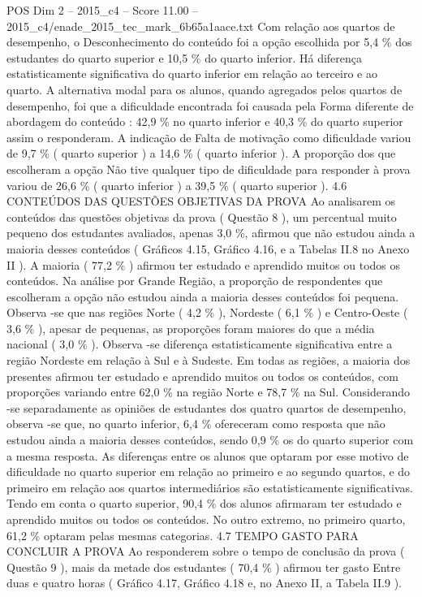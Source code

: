 \begin{textsample}{POS Dim 2 – 2015\_c4 – Score 11.00 – 2015\_c4/enade\_2015\_tec\_mark\_6b65a1aace.txt}
Com relação aos quartos de desempenho, o Desconhecimento do conteúdo foi a opção escolhida por 5,4 \% dos estudantes do quarto superior e 10,5 \% do quarto inferior.
Há diferença estatisticamente significativa do quarto inferior em relação ao terceiro e ao quarto.
A alternativa modal para os alunos, quando agregados pelos quartos de desempenho, foi que a dificuldade encontrada foi causada pela Forma diferente de abordagem do conteúdo : 42,9 \% no quarto inferior e 40,3 \% do quarto superior assim o responderam.
A indicação de Falta de motivação como dificuldade variou de 9,7 \% ( quarto superior ) a 14,6 \% ( quarto inferior ).
A proporção dos que escolheram a opção Não tive qualquer tipo de dificuldade para responder à prova variou de 26,6 \% ( quarto inferior ) a 39,5 \% ( quarto superior ). 4.6 CONTEÚDOS DAS QUESTÕES OBJETIVAS DA PROVA Ao analisarem os conteúdos das questões objetivas da prova ( Questão 8 ), um percentual muito pequeno dos estudantes avaliados, apenas 3,0 \%, afirmou que não estudou ainda a maioria desses conteúdos ( Gráficos 4.15, Gráfico 4.16, e a Tabelas II.8 no Anexo II ).
A maioria ( 77,2 \% ) afirmou ter estudado e aprendido muitos ou todos os conteúdos.
Na análise por Grande Região, a proporção de respondentes que escolheram a opção não estudou ainda a maioria desses conteúdos foi pequena.
Observa -se que nas regiões Norte ( 4,2 \% ), Nordeste ( 6,1 \% ) e Centro-Oeste ( 3,6 \% ), apesar de pequenas, as proporções foram maiores do que a média nacional ( 3,0 \% ).
Observa -se diferença estatisticamente significativa entre a região Nordeste em relação à Sul e à Sudeste.
Em todas as regiões, a maioria dos presentes afirmou ter estudado e aprendido muitos ou todos os conteúdos, com proporções variando entre 62,0 \% na região Norte e 78,7 \% na Sul.
Considerando -se separadamente as opiniões de estudantes dos quatro quartos de desempenho, observa -se que, no quarto inferior, 6,4 \% ofereceram como resposta que não estudou ainda a maioria desses conteúdos, sendo 0,9 \% os do quarto superior com a mesma resposta.
As diferenças entre os alunos que optaram por esse motivo de dificuldade no quarto superior em relação ao primeiro e ao segundo quartos, e do primeiro em relação aos quartos intermediários são estatisticamente significativas.
Tendo em conta o quarto superior, 90,4 \% dos alunos afirmaram ter estudado e aprendido muitos ou todos os conteúdos.
No outro extremo, no primeiro quarto, 61,2 \% optaram pelas mesmas categorias. 4.7 TEMPO GASTO PARA CONCLUIR A PROVA Ao responderem sobre o tempo de conclusão da prova ( Questão 9 ), mais da metade dos estudantes ( 70,4 \% ) afirmou ter gasto Entre duas e quatro horas ( Gráfico 4.17, Gráfico 4.18 e, no Anexo II, a Tabela II.9 ).

\end{textsample}
